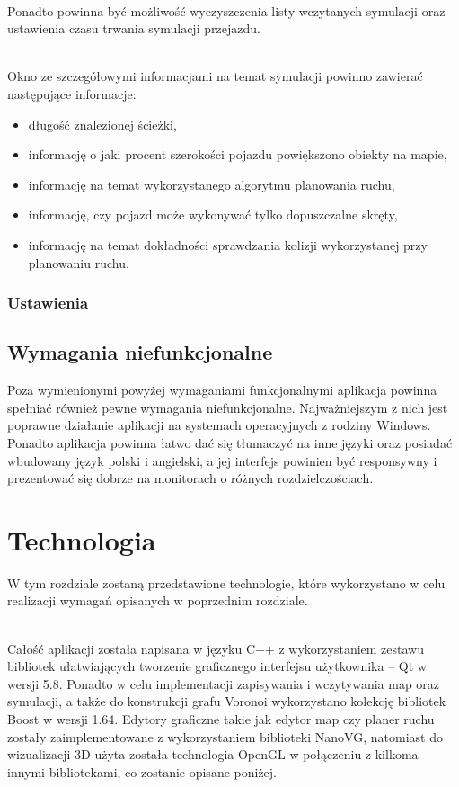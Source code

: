 \documentclass[a4paper,11pt,twoside]{report}
\theoremstyle{definition}
\begin{document}
~\\Ponadto powinna być możliwość wyczyszczenia listy wczytanych symulacji oraz ustawienia czasu trwania symulacji przejazdu.

~\\Okno ze szczegółowymi informacjami na temat symulacji powinno zawierać następujące informacje:
\begin{itemize}
	\item długość znalezionej ścieżki,
	\item informację o jaki procent szerokości pojazdu powiększono obiekty na mapie,
	\item informację na temat wykorzystanego algorytmu planowania ruchu,
	\item informację, czy pojazd może wykonywać tylko dopuszczalne skręty,
	\item informację na temat dokładności sprawdzania kolizji wykorzystanej przy planowaniu ruchu.
\end{itemize}

\subsection{Ustawienia}


\section{Wymagania niefunkcjonalne}

Poza wymienionymi powyżej wymaganiami funkcjonalnymi aplikacja powinna spełniać również pewne wymagania niefunkcjonalne. Najważniejszym z nich jest poprawne działanie aplikacji na systemach operacyjnych z rodziny Windows. Ponadto aplikacja powinna łatwo dać się tłumaczyć na inne języki oraz posiadać wbudowany język polski i angielski, a jej interfejs powinien być responsywny i prezentować się dobrze na monitorach o różnych rozdzielczościach.

\chapter{Technologia}

W tym rozdziale zostaną przedstawione technologie, które wykorzystano w celu realizacji wymagań opisanych w poprzednim rozdziale.

~\\Całość aplikacji została napisana w języku C++ z wykorzystaniem zestawu bibliotek ułatwiających tworzenie graficznego interfejsu użytkownika – Qt w wersji 5.8. Ponadto w celu implementacji zapisywania i wczytywania map oraz symulacji, a także do konstrukcji grafu Voronoi wykorzystano kolekcję bibliotek Boost w wersji 1.64. Edytory graficzne takie jak edytor map czy planer ruchu zostały zaimplementowane z wykorzystaniem biblioteki NanoVG, natomiast do wizualizacji 3D użyta została technologia OpenGL w połączeniu z kilkoma innymi bibliotekami, co zostanie opisane poniżej. 
\end{document}
